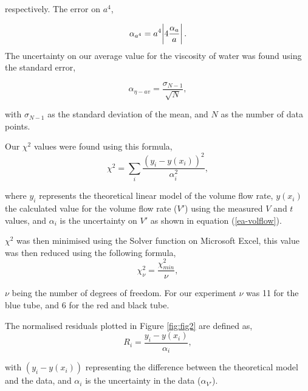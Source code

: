 \documentclass[twocolumn]{revtex4}
\begin{document}
respectively. The error on $a^4$, 

\begin{equation} 
\alpha_{a^4} = a^4 \abs{4 \frac{\alpha_a}{a}}.
\label{ea-tube}
\end{equation}
The uncertainty on our average value for the viscosity of water was found using the standard error,

\begin{equation} 
\alpha_{\eta-av} = \frac{\sigma_{N-1}}{\sqrt{N}},
\label{ea-standarddev}
\end{equation}

with $\sigma_{N-1}$ as the standard deviation of the mean, and $N$ as the number of data points. 

Our $\chi^2$ values were found using this formula, 
\begin{equation} 
\chi^2 = \sum_i \frac{(y_i - y(x_i))^2}{\alpha_i^2},
\label{ea-chisquared}
\end{equation}

where $y_i$ represents the theoretical linear model of the volume flow rate, $y(x_i)$ the calculated value for the volume flow rate ($V'$) using the measured $V$ and $t$ values, and $\alpha_i$ is the uncertainty on $V'$ as shown in equation (\ref{ea-volflow}).

$\chi^2$ was then minimised using the Solver function on Microsoft Excel, this value was then reduced using the following formula,
\begin{equation} 
\chi^2_{\nu} = \frac{\chi^2_{min}}{\nu},
\label{ea-redchisquared}
\end{equation}

$\nu$ being the number of degrees of freedom. For our experiment $\nu$ was 11 for the blue tube, and 6 for the red and black tube.

The normalised residuals plotted in Figure \ref{fig:fig2} are defined as,
\begin{equation} 
R_i = \frac{y_i - y(x_i)}{\alpha_i},
\label{ea-normalisedresid}
\end{equation}

with $(y_i - y(x_i))$ representing the difference between the theoretical model and the data, and $\alpha_i$ is the uncertainty in the data ($\alpha_{V'}$).


\clearpage
\end{document}
